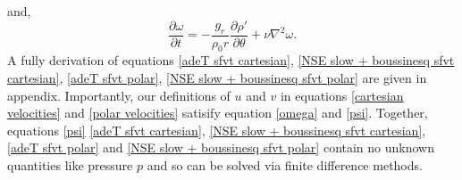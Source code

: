 \documentclass{article}
\begin{document}
and,
\begin{equation}
	\frac{\partial \omega}{\partial t} = - \frac{g_r}{\rho_0 r} \frac{\partial \rho'}{\partial \theta} +\nu \nabla^2 \omega.
	\label{NSE slow + boussinesq sfvt polar}
\end{equation}
A fully derivation of equations \ref{adeT sfvt cartesian}, \ref{NSE slow + boussinesq sfvt cartesian}, \ref{adeT sfvt polar}, \ref{NSE slow + boussinesq sfvt polar} are given in appendix.
Importantly, our definitions of $u$ and $v$ in equations \ref{cartesian velocities} and \ref{polar velocities} satisify equation \ref{omega} and \ref{psi}. Together, equations \ref{psi} \ref{adeT sfvt cartesian}, \ref{NSE slow + boussinesq sfvt cartesian}, \ref{adeT sfvt polar} and \ref{NSE slow + boussinesq sfvt polar} contain no unknown quantities like pressure $p$ and so can be solved via finite difference methods.
\end{document}
